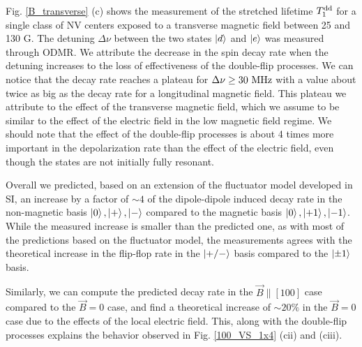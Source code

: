 \documentclass[preprintnumbers,amsmath,amssymb,superscriptaddress,twocolumn,showpacs]{revtex4-2}
\begin{document}
Fig. \ref{B_transverse} (c) shows the measurement of the stretched lifetime $T_1^{\rm dd}$ for a single class of NV centers exposed to a transverse magnetic field between 25 and 130 G. The detuning $\Delta \nu$ between the two states $\ket{d}$ and $\ket{e}$ was measured through ODMR. We attribute the decrease in the spin decay rate when the detuning increases to the loss of effectiveness of the double-flip processes. We can notice that the decay rate reaches a plateau for $\Delta \nu \geq 30\ \rm MHz$ with a value about twice as big as the decay rate for a longitudinal magnetic field. This plateau we attribute to the effect of the transverse magnetic field, which we assume to be similar to the effect of the electric field in the low magnetic field regime. We should note that the effect of the double-flip processes is about 4 times more important in the depolarization rate than the effect of the electric field, even though the states are not initially fully resonant.

Overall we predicted, based on an extension of the fluctuator model developed in SI, an increase by a factor of $\sim 4$ of the dipole-dipole induced decay rate in the non-magnetic basis $\ket{0}, \ket{+}, \ket{-}$ compared to the magnetic basis $\ket{0}, \ket{+1}, \ket{-1}$. While the measured increase is smaller than the predicted one, as with most of the predictions based on the fluctuator model, the measurements agrees with the theoretical increase in the flip-flop rate in the $\ket{+/-}$ basis compared to the $\ket{\pm 1}$ basis.

Similarly, we can compute the predicted decay rate in the $\vec B \parallel \left[100\right]$ case compared to the $\vec B = 0$ case, and find a theoretical increase of $\sim 20\%$ in the $\vec B = 0$ case due to the effects of the local electric field. This, along with the double-flip processes explains the behavior observed in Fig. \ref{100_VS_1x4} (cii) and (ciii).
\end{document}

